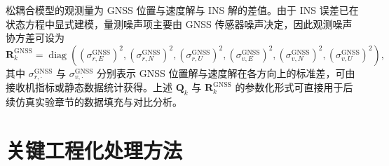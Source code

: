 松耦合模型的观测量为 GNSS 位置与速度解与 INS 解的差值。由于 INS 误差已在状态方程中显式建模，量测噪声项主要由 GNSS 传感器噪声决定，因此观测噪声协方差可设为
\begin{equation}
	\bm{R}^{\text{GNSS}}_k=
	\operatorname{diag}
	\left(
	\left(\sigma^{\text{GNSS}}_{r,E}\right)^2,\left(\sigma^{\text{GNSS}}_{r,N}\right)^2,\left(\sigma^{\text{GNSS}}_{r,U}\right)^2,
	\left(\sigma^{\text{GNSS}}_{v,E}\right)^2,\left(\sigma^{\text{GNSS}}_{v,N}\right)^2,\left(\sigma^{\text{GNSS}}_{v,U}\right)^2
	\right),
	\label{eq:ch4_Rk_def}
\end{equation}
其中 $\sigma^{\text{GNSS}}_{r,\cdot}$ 与 $\sigma^{\text{GNSS}}_{v,\cdot}$ 分别表示 GNSS 位置解与速度解在各方向上的标准差，可由接收机指标或静态数据统计获得。上述 $\bm{Q}_k$ 与 $\bm{R}^{\text{GNSS}}_k$ 的参数化形式可直接用于后续仿真实验章节的数据填充与对比分析。

        
        
    




\section{关键工程化处理方法}

